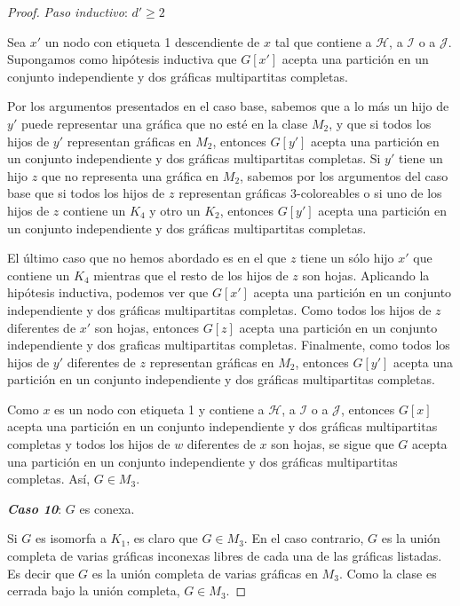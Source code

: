 \begin{proof}
\emph{Paso inductivo}: $d'\geq2$

Sea $x'$ un nodo con etiqueta 1 descendiente de $x$ tal que contiene a $\mathcal{H}$, a $\mathcal{I}$ o a $\mathcal{J}$. Supongamos como hipótesis inductiva que $G[x']$ acepta una partición en un conjunto independiente y dos gráficas multipartitas completas.

Por los argumentos presentados en el caso base, sabemos que a lo más un hijo de $y'$ puede representar una gráfica que no esté en la clase $M_2$, y que si todos los hijos de $y'$ representan gráficas en $M_2$, entonces $G[y']$ acepta una partición en un conjunto independiente y dos gráficas multipartitas completas. Si $y'$ tiene un hijo $z$ que no representa una gráfica en $M_2$, sabemos por los argumentos del caso base que si todos los hijos de $z$ representan gráficas 3-coloreables o si uno de los hijos de $z$ contiene un $K_4$ y otro un $K_2$, entonces $G[y']$ acepta una partición en un conjunto independiente y dos gráficas multipartitas completas.

El último caso que no hemos abordado es en el que $z$ tiene un sólo hijo $x'$ que contiene un $K_4$ mientras que el resto de los hijos de $z$ son hojas. Aplicando la hipótesis inductiva, podemos ver que $G[x']$ acepta una partición en un conjunto independiente y dos gráficas multipartitas completas. Como todos los hijos de $z$ diferentes de $x'$ son hojas, entonces $G[z]$ acepta una partición en un conjunto independiente y dos graficas multipartitas completas. Finalmente, como todos los hijos de $y'$ diferentes de $z$ representan gráficas en $M_2$, entonces $G[y']$ acepta una partición en un conjunto independiente y dos gráficas multipartitas completas.

Como $x$ es un nodo con etiqueta 1 y contiene a $\mathcal{H}$, a $\mathcal{I}$ o a $\mathcal{J}$, entonces $G[x]$ acepta una partición en un conjunto independiente y dos gráficas multipartitas completas y todos los hijos de $w$ diferentes de $x$ son hojas, se sigue que $G$ acepta una partición en un conjunto independiente y dos gráficas multipartitas completas. Así, $G\in M_3$.


\emph{\textbf{Caso 10}}: $G$ es conexa.

Si $G$ es isomorfa a $K_1$, es claro que $G\in M_3$. En el caso contrario, $G$ es la unión completa de varias gráficas inconexas libres de cada una de las gráficas listadas. Es decir que $G$ es la unión completa de varias gráficas en $M_3$. Como la clase es cerrada bajo la unión completa, $G\in M_3$.

\end{proof}
